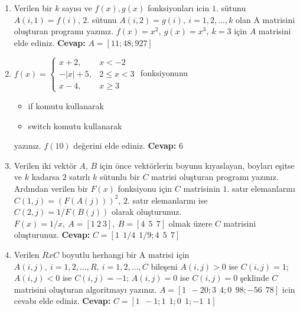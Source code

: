 \documentclass{assignment}
\date{Aralık, 2023}
\begin{document}
\begin{enumerate}
\item Verilen bir \(k \) sayısı ve \(f(x),g(x)\) fonksiyonları icin \(1.\) sütunu \( A(i,1)=f(i)\), \(2.\) sütunu \( A(i,2)=g(i),\: i=1,2,...,k \) 
olan A matrisini oluşturan programı yazınız. \(f(x)=x^2, \: g(x)=x^3,\: k=3 \) için \(A\) matrisini elde ediniz. 
\newline 
\newline 
\textbf{Cevap:} \(A=[1 1; 4 8; 9 27]\) \\
\item 
\(f(x)= \begin{cases} x+2, & x<-2 \\ -|x|+5, & 2 \leq x <3 \\ x-4, & x \geq 3\end{cases} \) fonksiyonunu 
\begin{itemize}
\item if komutu kullanarak
\item  switch komutu kullanarak 
\end{itemize}
yazınız. \(f(10)\) değerini elde ediniz. 
\newline 
\newline 
\textbf{Cevap:} \(6\) \\
\item  Verilen iki vektör \(A\), \(B\) için önce vektörlerin boyunu kıyaslayan, boyları eşitse
 ve \(k\) kadarsa \(2\) satırlı \(k\) sütunlu bir \(C\) matrisi oluşturan programı yazınız.
 Ardından verilen bir \(F(x)\) fonksiyonu için \(C\) matrisinin \(1.\) satır elemanlarını \(C(1,j)=(F(A(j)))^{2}\), \(2.\) satır elemanlarını ise 
\(C(2,j)=1/F(B(j))\) olarak oluşturunuz. \(F(x)= 1/x,\: A=[1\:  2 \: 3], \:B=[4 \:\: 5 \:\: 7 ]\)
olmak üzere \(C\) matrisini oluşturunuz.
 \newline 
 \newline 
\textbf{Cevap:} \(C=[1 \:\: 1/4 \:\: 1/9; 4 \:\: 5 \:\: 7]\) \\

\item Verilen \(R xC\) boyutlu herhangi bir  A matrisi için \(A(i,j),\: i=1,2,... ,R,\: i=1,2,... ,C\)  bileşeni \(A(i,j)>0\) ise \(C(i,j)=1\); 
\(A(i,j)<0\) ise \(C(i,j)=-1\); 
\(A(i,j)=0\) ise \(C(i,j)=0\) şeklinde \(C\) matrisini oluşturan  algoritmayı yazınız. 
\(A=[1 \:\: -20 ; 3 \:\: 4; 0 \:\: 98; -56 \:\:  78]\) icin cevabı elde ediniz. 
 \newline 
 \newline 
\textbf{Cevap:} \(C=[1 \:\: -1; 1 \:\: 1; 0 \:\: 1; -1 \:\: 1]\)\\


\end{enumerate}
\end{document}
